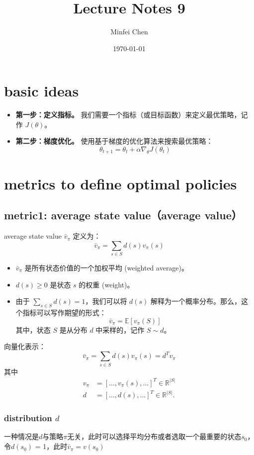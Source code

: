 \documentclass{article}
\begin{document}
\title{Lecture Notes 9}
\author{Minfei Chen}
\date{\today}
\maketitle
\section{basic ideas}
\begin{itemize}
    \item \textbf{第一步：定义指标。} 我们需要一个指标（或目标函数）来定义最优策略，记作 $J(\theta)$。
    
    \item \textbf{第二步：梯度优化。} 使用基于梯度的优化算法来搜索最优策略：
    \[
    \theta_{t+1} = \theta_t + \alpha \nabla_{\theta} J(\theta_t)
    \]
\end{itemize}
\section{metrics to define optimal policies}
\subsection{metric1: average state value（average value）}
average state value $\bar{v}_{\pi}$ 定义为：
\[
\bar{v}_{\pi} = \sum_{s \in S} d(s) v_{\pi}(s)
\]

\begin{itemize}
    \item $\bar{v}_{\pi}$ 是所有状态价值的一个加权平均 (weighted average)。
    
    \item $d(s) \ge 0$ 是状态 $s$ 的权重 (weight)。
    
    \item 由于 $\sum_{s \in S} d(s) = 1$，我们可以将 $d(s)$ 解释为一个概率分布。那么，这个指标可以写作期望的形式：
    \[
    \bar{v}_{\pi} = \mathbb{E}[v_{\pi}(S)]
    \]
    其中，状态 $S$ 是从分布 $d$ 中采样的，记作 $S \sim d$。
\end{itemize}
向量化表示：
\[
\bar{v}_{\pi} = \sum_{s \in S} d(s) v_{\pi}(s) = d^T v_{\pi}
\]
其中
\begin{align*}
    v_{\pi} &= [ \dots, v_{\pi}(s), \dots ]^T \in \mathbb{R}^{|S|} \\
    d &= [ \dots, d(s), \dots ]^T \in \mathbb{R}^{|S|}.
\end{align*}
\subsubsection{distribution $d$}
一种情况是$d$与策略$\pi$无关，此时可以选择平均分布或者选取一个最重要的状态$s_0$，令$d(s_0)$ = 1，此时$\bar{v}_{\pi} = v(s_0)$
\end{document}
